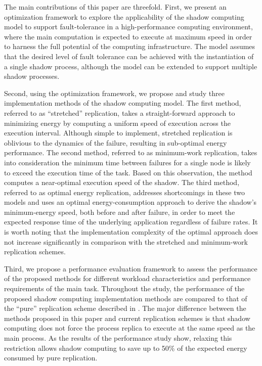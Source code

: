 The main contributions of this paper are threefold. First, we present
an optimization framework to explore the applicability of the shadow
computing model to support fault-tolerance in a high-performance
computing environment, where the main computation is expected to
execute at maximum speed in order to harness the full potential of the
computing infrastructure. The model assumes that the desired level of
fault tolerance can be achieved with the instantiation of a single
shadow process, although the model can be extended to support multiple
shadow processes.  

Second, using the optimization framework, we propose and study three
implementation methods of the shadow computing model. The first
method, referred to as ``stretched'' replication, takes a
straight-forward approach to minimizing energy by computing a uniform
speed of execution across the execution interval.  Although simple to
implement, stretched replication is oblivious to the dynamics of the
failure, resulting in sub-optimal energy performance.  The second
method, referred to as minimum-work replication, takes into
consideration the minimum time between failures for a single node is
likely to exceed the execution time of the task. Based on this
observation, the method computes a near-optimal execution speed of the
shadow. The third method, referred to as optimal energy replication,
addresses shortcomings in these two models and uses an optimal
energy-consumption approach to derive the shadow's minimum-energy
speed, both before and after failure, in order to meet the expected
response time of the underlying application regardless of failure
rates. It is worth noting that the implementation complexity of the
optimal approach does not increase significantly in comparison with
the stretched and minimum-work replication schemes.

Third, we propose a performance evaluation framework to assess the
performance of the proposed methods for different workload
characteristics and performance requirements of the main
task. Throughout the study, the performance of the proposed shadow
computing implementation methods are compared to that of the ``pure''
replication scheme described in
\cite{ferreira_hpc_2011}. The major difference between the methods
proposed in this paper and current replication schemes is that shadow
computing does not force the process replica to execute at the same
speed as the main process. As the results of the performance study
show, relaxing this restriction allows shadow computing to save up to
50\% of the expected energy consumed by pure replication.

